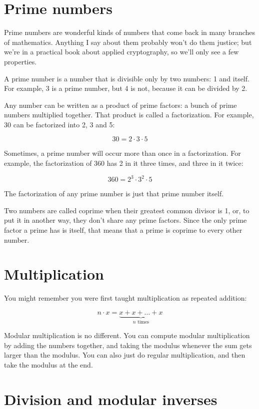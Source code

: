 \documentclass[11pt,ebook,table,dvipsnames]{memoir}
\begin{document}
\section{Prime numbers}
\label{sec-4-1-2}

Prime numbers are wonderful kinds of numbers that come back in many
branches of mathematics. Anything I say about them probably won't do
them justice; but we're in a practical book about applied
cryptography, so we'll only see a few properties.

A prime number is a number that is divisible only by two numbers: 1
and itself. For example, 3 is a prime number, but 4 is not, because it
can be divided by 2.

Any number can be written as a product of prime factors: a bunch of
prime numbers multiplied together. That product is called a
factorization. For example, 30 can be factorized into 2, 3 and 5:

\[
30 = 2 \cdot 3 \cdot 5
\]

Sometimes, a prime number will occur more than once in a
factorization. For example, the factorization of 360 has 2 in it
three times, and three in it twice:

\[
360 = 2^3 \cdot 3^2 \cdot 5
\]

The factorization of any prime number is just that prime number itself.

Two numbers are called coprime when their greatest common divisor is
1, or, to put it in another way, they don't share any prime factors.
Since the only prime factor a prime has is itself, that means that a
prime is coprime to every other number.
\section{Multiplication}
\label{sec-4-1-3}

You might remember you were first taught multiplication as repeated
addition:

\[
n \cdot x = \underbrace{x + x + \ldots + x}_{n \text{ times}}
\]

Modular multiplication is no different. You can compute modular
multiplication by adding the numbers together, and taking the modulus
whenever the sum gets larger than the modulus. You can also just do
regular multiplication, and then take the modulus at the end.
\section{Division and modular inverses}
\label{sec-4-1-4}
\end{document}
